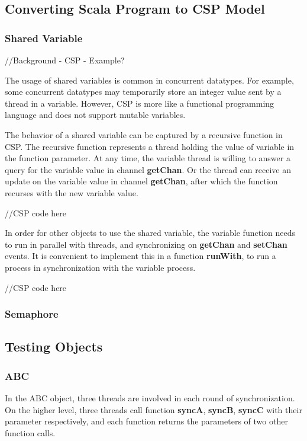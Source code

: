 \documentclass{article}
\begin{document}
\subsection{Converting Scala Program to CSP Model}
\subsubsection{Shared Variable}
//Background - CSP - Example? 

The usage of shared variables is common in concurrent datatypes. For example, some concurrent datatypes may temporarily store an integer value sent by a thread in a variable. However, CSP is more like a functional programming language and does not support mutable variables. 

The behavior of a shared variable can be captured by a recursive function in CSP. The recursive function represents a thread holding the value of variable in the function parameter. At any time, the variable thread is willing to answer a query for the variable value in channel \textbf{getChan}. Or the thread can receive an update on the variable value in channel \textbf{getChan}, after which the function recurses with the new variable value.

//CSP code here

In order for other objects to use the shared variable, the variable function needs to run in parallel with threads, and synchronizing on \textbf{getChan} and \textbf{setChan} events. It is convenient to implement this in a function \textbf{runWith}, to run a process in synchronization with the variable process.

//CSP code here

\subsubsection{Semaphore}



\subsection{Testing Objects}
\subsubsection{ABC}
In the ABC object, three threads are involved in each round of synchronization. On the higher level, three threads call function \textbf{syncA}, \textbf{syncB}, \textbf{syncC} with their parameter respectively, and each function returns the parameters of two other function calls.
\end{document}
